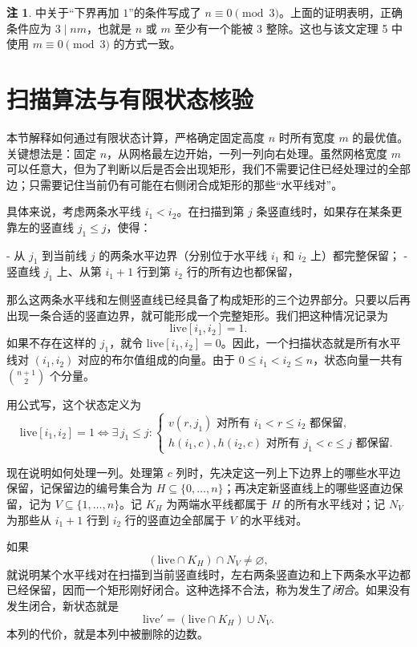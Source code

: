 \documentclass[11pt]{ctexart}
\theoremstyle{definition}
\newtheorem{remark}[theorem]{注}
\begin{document}
\begin{remark}\label{rem:errata}
\cite{NT25} 中关于“下界再加 $1$”的条件写成了 $n\equiv0\pmod3$。上面的证明表明，正确条件应为 $3\mid nm$，也就是 $n$ 或 $m$ 至少有一个能被 $3$ 整除。这也与该文定理 5 中使用 $m\equiv0\pmod3$ 的方式一致。
\end{remark}
\section{扫描算法与有限状态核验}\label{sec:scan}

本节解释如何通过有限状态计算，严格确定固定高度 $n$ 时所有宽度 $m$ 的最优值。关键想法是：固定 $n$，从网格最左边开始，一列一列向右处理。虽然网格宽度 $m$ 可以任意大，但为了判断以后是否会出现矩形，我们不需要记住已经处理过的全部边；只需要记住当前仍有可能在右侧闭合成矩形的那些“水平线对”。

具体来说，考虑两条水平线 $i_1<i_2$。在扫描到第 $j$ 条竖直线时，如果存在某条更靠左的竖直线 $j_1\le j$，使得：

- 从 $j_1$ 到当前线 $j$ 的两条水平边界（分别位于水平线 $i_1$ 和 $i_2$ 上）都完整保留；
- 竖直线 $j_1$ 上、从第 $i_1+1$ 行到第 $i_2$ 行的所有边也都保留，

那么这两条水平线和左侧竖直线已经具备了构成矩形的三个边界部分。只要以后再出现一条合适的竖直边界，就可能形成一个完整矩形。我们把这种情况记录为
\[
\mathrm{live}[i_1,i_2]=1.
\]
如果不存在这样的 $j_1$，就令 $\mathrm{live}[i_1,i_2]=0$。因此，一个扫描状态就是所有水平线对 $(i_1,i_2)$ 对应的布尔值组成的向量。由于 $0\le i_1<i_2\le n$，状态向量一共有
$\binom{n+1}{2}$ 个分量。

用公式写，这个状态定义为
\[
\mathrm{live}[i_1,i_2]=1
\iff
\exists\,j_1\le j:
\begin{cases}
v(r,j_1)\text{ 对所有 }i_1<r\le i_2\text{ 都保留},\\
h(i_1,c),h(i_2,c)\text{ 对所有 }j_1<c\le j\text{ 都保留}.
\end{cases}
\]

现在说明如何处理一列。处理第 $c$ 列时，先决定这一列上下边界上的哪些水平边保留，记保留边的编号集合为
$H\subseteq\{0,\ldots,n\}$；再决定新竖直线上的哪些竖直边保留，记为
$V\subseteq\{1,\ldots,n\}$。记 $K_H$ 为两端水平线都属于 $H$ 的所有水平线对；记 $N_V$ 为那些从 $i_1+1$ 行到 $i_2$ 行的竖直边全部属于 $V$ 的水平线对。

如果
\[
(\mathrm{live}\cap K_H)\cap N_V\ne\varnothing,
\]
就说明某个水平线对在扫描到当前竖直线时，左右两条竖直边和上下两条水平边都已经保留，因而一个矩形刚好闭合。这种选择不合法，称为发生了\emph{闭合}。如果没有发生闭合，新状态就是
\[
\mathrm{live}'=(\mathrm{live}\cap K_H)\cup N_V.
\]
本列的代价，就是本列中被删除的边数。
\end{document}
